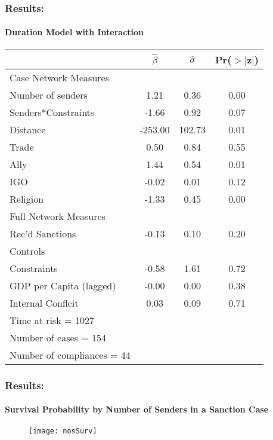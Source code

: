 \documentclass{beamer}
\begin{document}
\begin{frame}
\frametitle{Results:}
\framesubtitle{Duration Model with Interaction}

\footnotesize{
	\begin{table}[ht]
		\begin{center}
			\begin{tabular}{lccc}
			\hline\hline
			&$\hat{\beta}$&$\hat{\sigma}$& Pr($>$$|$z$|$) \\
			\hline
			Case Network Measures \\		
			\;\;\; Number of senders & 1.21 & 0.36 & 0.00 \\ 
			\;\;\; Senders*Constraints & -1.66 & 0.92 & 0.07 \\ 		
			\;\;\; Distance & -253.00 & 102.73 & 0.01 \\ 		
			\;\;\; Trade & 0.50 & 0.84 & 0.55 \\ 
			\;\;\; Ally & 1.44 & 0.54 & 0.01 \\ 
			\;\;\; IGO & -0.02 & 0.01 & 0.12 \\		
			\;\;\; Religion & -1.33 & 0.45 & 0.00 \\ 
			Full Network Measures \\		
			\;\;\; Rec'd Sanctions & -0.13 & 0.10 & 0.20 \\ 
			Controls \\		
			\;\;\; Constraints & -0.58 & 1.61 & 0.72 \\ 
			\;\;\; GDP per Capita (lagged) & -0.00 & 0.00 & 0.38 \\ 
			\;\;\; Internal Conflcit & 0.03 & 0.09 & 0.71 \\ 
			\hline
			Time at risk = 1027 &&&\\
			Number of cases = 154 &&&\\
			Number of compliances = 44 &&&\\
			\hline\hline
		\end{tabular}
		\end{center}
	\end{table}
}
\end{frame}

\begin{frame}
\frametitle{Results:}
\framesubtitle{Survival Probability by Number of Senders in a Sanction Case}

\vspace{0.7cm}
\begin{figure}[ht]
	\centering
	\texttt{[image: nosSurv]}
\end{figure}

\end{frame}
\end{document}
